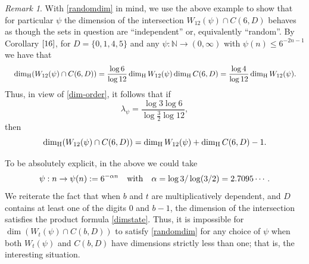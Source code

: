 \documentclass[12pt]{article}
\theoremstyle{definition}
\theoremstyle{remark}
\newtheorem{remark}{{Remark}}[section]
\begin{document}
\begin{remark}  \label{randomdimrem}
With \eqref{randomdim} in mind, we use the above  example to show that for particular $\psi$ the dimension of the intersection $W_{12}(\psi)\cap C(6,D)$  behaves as though the sets in question are “independent” or, equivalently “random”.  By  Corollary $\ref{16}$, for  $D= \{0,1,4,5\}   $ and  any 
$\psi:\mathbb{N}\to(0,\infty)$ with $\psi(n)\le 6^{-2n-1}$  we have that 
\begin{equation*}
\begin{aligned}
&\quad\dim_{\rm H}(W_{12}(\psi)\cap C(6,D))=\frac{\log6}{\log12}\dim_{\rm H}W_{12}(\psi)\dim_{\rm H} C(6,D)=\frac{\log4}{\log12}\dim_{\rm H}W_{12}(\psi) .
\end{aligned}
\end{equation*}
Thus,  in view of \eqref{dim-order}, it follows that if
$$
\lambda_{\psi} = \frac{\log3\log6}{\log\frac{3}{2}\log12},
$$
then 
$$\dim_{\rm H}(W_{12}(\psi)\cap C(6,D))=\dim_{\rm H}W_{12}(\psi)+\dim_{\rm H}C(6,D)-1.$$

\noindent  To be absolutely explicit,  in the above we could  take $$ \psi: n \to  \psi(n):=6^{-\alpha n} \quad  {\rm  with}     \quad \alpha = \log3 /\log(3/2) = 2.7095\cdots\, . $$    We reiterate the fact  that when  $b$ and $t$ are multiplicatively dependent, and $D$ contains at least one of the digits $0$ and $b-1$,   the dimension of the intersection  satisfies the product formula   \eqref{dimstate}.  Thus,  it is impossible for
$\dim ( W_{t}(\psi)\cap C(b,D))   $ to satisfy \eqref{randomdim} for any choice of  $\psi$ when both $W_{t}(\psi)$ and $C(b,D)$ have dimensions strictly less than one; that is, the interesting situation.
\end{remark}
\end{document}

